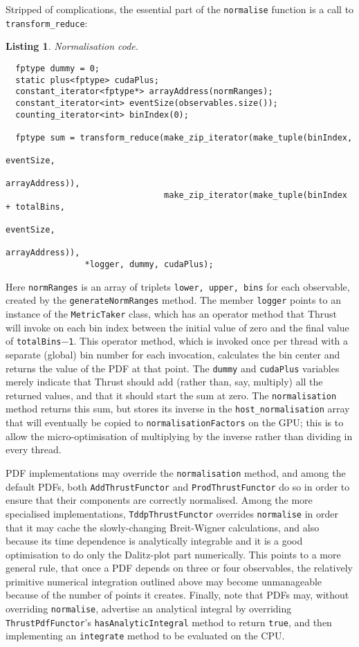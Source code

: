 \documentclass[12pt,pdflatex]{article}
\newtheorem{listing}{Listing}
\begin{document}
Stripped of complications, the essential part of the \texttt{normalise} function
is a call to \texttt{transform\_reduce}:
\begin{listing}
\label{listing:normalisation}
Normalisation code.

\begin{verbatim}
  fptype dummy = 0; 
  static plus<fptype> cudaPlus;
  constant_iterator<fptype*> arrayAddress(normRanges); 
  constant_iterator<int> eventSize(observables.size());
  counting_iterator<int> binIndex(0); 

  fptype sum = transform_reduce(make_zip_iterator(make_tuple(binIndex, 
                                                             eventSize, 
                                                             arrayAddress)),
                                make_zip_iterator(make_tuple(binIndex + totalBins, 
                                                             eventSize, 
                                                             arrayAddress)),
				*logger, dummy, cudaPlus); 
\end{verbatim}
\end{listing}
Here \texttt{normRanges} is an array of triplets \verb|lower, upper, bins| for each observable, created
by the \texttt{generateNormRanges} method. The member \texttt{logger} points to an instance of the
\texttt{MetricTaker} class, which has an operator method that Thrust will invoke on each bin index between
the initial value of zero and the final value of \texttt{totalBins$-$1}. This operator method, which is invoked once per
thread with a separate (global) bin number for each invocation, calculates
the bin center and returns the value of the PDF at that point.
The \texttt{dummy} and \texttt{cudaPlus} variables
merely indicate that Thrust should add (rather than, say, multiply) all the returned
values, and that it should start the sum at zero. The \texttt{normalisation} method
returns this sum, but stores its inverse in the \texttt{host\_normalisation} array
that will eventually be copied to \texttt{normalisationFactors} on the GPU; this is to allow the micro-optimisation of 
multiplying by the inverse rather than dividing in every thread. 

PDF implementations may override the \texttt{normalisation} method, and among the default
PDFs, both \texttt{AddThrustFunctor} and \texttt{ProdThrustFunctor} do so in order to
ensure that their components are correctly normalised. Among the more specialised
implementations, \texttt{TddpThrustFunctor} overrides \texttt{normalise} in order that
it may cache the slowly-changing Breit-Wigner calculations, and also because its time dependence
is analytically integrable and it is a good optimisation to do only the Dalitz-plot
part numerically. This points to a more general rule, that once a PDF depends on three
or four observables, the relatively primitive numerical integration outlined above may
become unmanageable because of the number of points it creates. Finally, note that PDFs
may, without overriding \texttt{normalise}, advertise an analytical integral by overriding
\texttt{ThrustPdfFunctor}'s \texttt{hasAnalyticIntegral} method to return \texttt{true}, 
and then implementing an \texttt{integrate} method to be evaluated on the CPU. 
\end{document}
